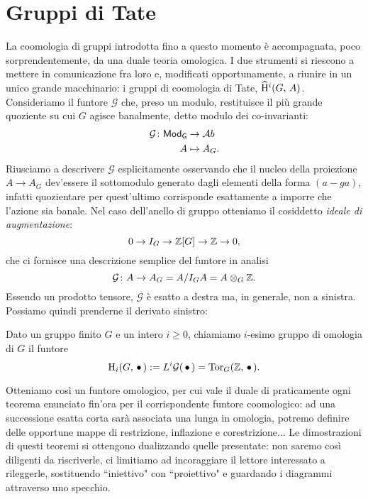 \section{Gruppi di Tate}
La coomologia di gruppi introdotta fino a questo momento è accompagnata, poco sorprendentemente, da una duale teoria omologica. I due strumenti si riescono a mettere in comunicazione fra loro e, modificati opportunamente, a riunire in un unico grande macchinario: i gruppi di coomologia di Tate, $ \operatorname{\widehat{H}^\mathnormal{i}}(G, \, A) $. \\

Consideriamo il funtore $ \mathcal{G} $ che, preso un modulo, restituisce il più grande quoziente su cui $ G $ agisce banalmente, detto modulo dei co-invarianti:
\begin{align*} 
\mathcal{G} \colon \mathsf{Mod}_\mathsf{G} &\to \mathcal{A}b \\
A &\mapsto A_G.
\end{align*}
Riusciamo a descrivere $ \mathcal{G} $ esplicitamente osservando che il nucleo della proiezione $ A \to A_G $ dev'essere il sottomodulo generato dagli elementi della forma $ (a - ga) $, infatti quozientare per quest'ultimo corrisponde esattamente a imporre che l'azione sia banale. Nel caso dell'anello di gruppo otteniamo il cosiddetto \emph{ideale di augmentazione}:
\[ 0 \to I_G \to \mathbb{Z}[G] \to \mathbb{Z} \to 0, \]
che ci fornisce una descrizione semplice del funtore in analisi
\[ \mathcal{G} \colon A \to A_G = A/I_GA = A \otimes_G \mathbb{Z}. \]
Essendo un prodotto tensore, $ \mathcal{G} $ è esatto a destra ma, in generale, non a sinistra. Possiamo quindi prenderne il derivato sinistro:

\begin{definition}
	Dato un gruppo finito $ G $ e un intero $ i \geq 0 $, chiamiamo $ i $-esimo gruppo di omologia di $ G $ il funtore
	\[ \operatorname{H}_i(G, \, \bullet \,) := L^i\mathcal{G}(\, \bullet \,) = \operatorname{Tor}_G(\mathbb{Z}, \, \bullet \, ). \]
\end{definition}

Otteniamo così un funtore omologico, per cui vale il duale di praticamente ogni teorema enunciato fin'ora per il corrispondente funtore coomologico: ad una successione esatta corta sarà associata una lunga in omologia, potremo definire delle opportune mappe di restrizione, inflazione e corestrizione... Le dimostrazioni di questi teoremi si ottengono dualizzando quelle presentate: non saremo così diligenti da riscriverle, ci limitiamo ad incoraggiare il lettore interessato a rileggerle, sostituendo \textquotedblleft iniettivo" con \textquotedblleft proiettivo" e guardando i diagrammi attraverso uno specchio. \\

